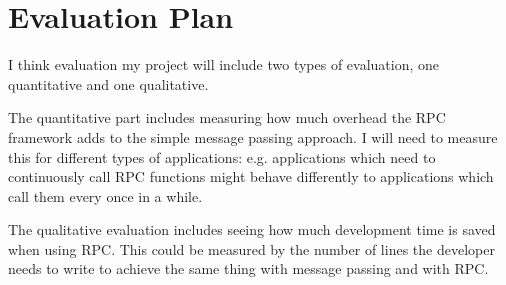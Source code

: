 \section{Evaluation Plan}
I think evaluation my project will include two types of evaluation, one quantitative and one qualitative.

The quantitative part includes measuring how much overhead the RPC framework adds to the simple message passing approach. I will need to measure this for different types of applications: e.g. applications which need to continuously call RPC functions might behave differently to applications which call them every once in a while.

The qualitative evaluation includes seeing how much development time is saved when using RPC. This could be measured by the number of lines the developer needs to write to achieve the same thing with message passing and with RPC.